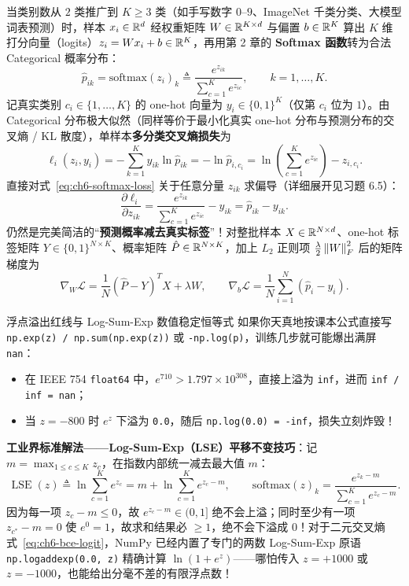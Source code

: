 当类别数从 $2$ 类推广到 $K \ge 3$ 类（如手写数字 $0$--$9$、ImageNet 千类分类、大模型词表预测）时，样本 $x_i \in \mathbb{R}^d$ 经权重矩阵 $W \in \mathbb{R}^{K\times d}$ 与偏置 $b \in \mathbb{R}^K$ 算出 $K$ 维打分向量（logits）$z_i = W x_i + b \in \mathbb{R}^K$，再用第 2 章的 \textbf{Softmax 函数}转为合法 Categorical 概率分布：
\[
  \hat{p}_{ik} = \mathrm{softmax}(z_i)_k \triangleq \frac{e^{z_{ik}}}{\sum_{c=1}^K e^{z_{ic}}},
  \qquad k = 1, \dots, K.
\]
记真实类别 $c_i \in \{1,\dots,K\}$ 的 one-hot 向量为 $y_i \in \{0,1\}^K$（仅第 $c_i$ 位为 $1$）。由 Categorical 分布极大似然（同样等价于最小化真实 one-hot 分布与预测分布的交叉熵 / KL 散度），单样本\textbf{多分类交叉熵损失}为
\begin{equation}
  \ell_i(z_i, y_i)
  = -\sum_{k=1}^K y_{ik}\ln \hat{p}_{ik}
  = -\ln \hat{p}_{i, c_i}
  = \ln\!\left(\sum_{c=1}^K e^{z_{ic}}\right) - z_{i, c_i}.
  \label{eq:ch6-softmax-loss}
\end{equation}
直接对式~\eqref{eq:ch6-softmax-loss} 关于任意分量 $z_{ik}$ 求偏导（详细展开见习题 6.5）：
\[
  \frac{\partial \ell_i}{\partial z_{ik}}
  = \frac{e^{z_{ik}}}{\sum_{c=1}^K e^{z_{ic}}} - y_{ik}
  = \hat{p}_{ik} - y_{ik}.
\]
仍然是完美简洁的“\textbf{预测概率减去真实标签}”！对整批样本 $X \in \mathbb{R}^{N\times d}$、one-hot 标签矩阵 $Y \in \{0,1\}^{N\times K}$、概率矩阵 $\hat{P} \in \mathbb{R}^{N\times K}$，加上 $L_2$ 正则项 $\frac{\lambda}{2}\left\|W\right\|_F^2$ 后的矩阵梯度为
\[
  \nabla_W \mathcal{L} = \frac{1}{N}(\hat{P} - Y)^T X + \lambda W,
  \qquad
  \nabla_b \mathcal{L} = \frac{1}{N}\sum_{i=1}^N (\hat{p}_i - y_i).
\]

\begin{failBox}{浮点溢出红线与 Log-Sum-Exp 数值稳定恒等式}
如果你天真地按课本公式直接写 \texttt{np.exp(z) / np.sum(np.exp(z))} 或 \texttt{-np.log(p)}，训练几步就可能爆出满屏 \texttt{nan}：
\begin{itemize}
  \item 在 IEEE 754 \texttt{float64} 中，$e^{710} > 1.797 \times 10^{308}$，直接上溢为 \texttt{inf}，进而 \texttt{inf / inf = nan}；
  \item 当 $z = -800$ 时 $e^{z}$ 下溢为 \texttt{0.0}，随后 \texttt{np.log(0.0) = -inf}，损失立刻炸毁！
\end{itemize}
\textbf{工业界标准解法——Log-Sum-Exp（LSE）平移不变技巧}：记 $m = \max_{1\le c\le K} z_c$，在指数内部统一减去最大值 $m$：
\begin{equation}
  \operatorname{LSE}(z) \triangleq \ln\sum_{c=1}^K e^{z_c} = m + \ln\sum_{c=1}^K e^{z_c - m},
  \qquad
  \mathrm{softmax}(z)_k = \frac{e^{z_k - m}}{\sum_{c=1}^K e^{z_c - m}}.
  \label{eq:ch6-lse}
\end{equation}
因为每一项 $z_c - m \le 0$，故 $e^{z_c - m} \in (0, 1]$ 绝不会上溢；同时至少有一项 $z_{c^*} - m = 0$ 使 $e^0 = 1$，故求和结果必 $\ge 1$，绝不会下溢成 $0$！对于二元交叉熵式~\eqref{eq:ch6-bce-logit}，NumPy 已经内置了专门的两数 Log-Sum-Exp 原语 \texttt{np.logaddexp(0.0, z)} 精确计算 $\ln(1 + e^z)$——哪怕传入 $z = +1000$ 或 $z = -1000$，也能给出分毫不差的有限浮点数！
\end{failBox}


